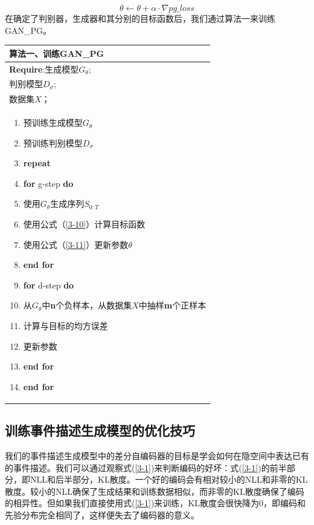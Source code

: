 \begin{equation}\label{3-11}
    \theta \leftarrow \theta + \alpha \cdot \nabla pg\_loss
\end{equation}
在确定了判别器，生成器和其分别的目标函数后，我们通过算法一来训练GAN\_PG。
\begin{table}[htb]
    
    \centering
        \begin{tabular*}{\linewidth}{p{\linewidth}}
\toprule
            算法一、训练GAN\_PG \\
\midrule
\textbf{Require}:生成模型$G_\theta$;\\
判别模型$D_\sigma$;\\
数据集$X$；\\ 
\begin{minipage}[t]{\linewidth}
\begin{enumerate}[itemsep=-3pt]
    \item 预训练生成模型$G_\theta$
    \item 预训练判别模型$D_\sigma$
    \item \textbf{repeat}
    \item \quad \textbf{for} g-step \textbf{do}
    \item \quad \quad 使用$G_\theta$生成序列$S_{0:T}$
    \item \quad \quad 使用公式（\ref{3-10}）计算目标函数
    \item \quad \quad 使用公式（\ref{3-11}）更新参数$\theta$
    \item \quad \textbf{end for}
    \item \quad \textbf{for} d-step \textbf{do}
    \item \quad \quad 从$G_\theta$中\textbf{n}个负样本，从数据集$X$中抽样\textbf{m}个正样本
    \item \quad \quad 计算与目标的均方误差
    \item \quad \quad 更新参数
    \item \quad \textbf{end for}  
    \item \textbf{end for}
\end{enumerate}
\end{minipage}\\
\bottomrule
        \end{tabular*}
    \label{s3-1}
\end{table}

\subsection{训练事件描述生成模型的优化技巧}\label{train_generator}
我们的事件描述生成模型中的差分自编码器的目标是学会如何在隐空间中表达已有的事件描述。我们可以通过观察式(\ref{3-1})来判断编码的好坏：式(\ref{3-1})的前半部分，即NLL和后半部分，KL散度。一个好的编码会有相对较小的NLL和非零的KL散度。较小的NLL确保了生成结果和训练数据相似，而非零的KL散度确保了编码的相异性。但如果我们直接使用式(\ref{3-1})来训练，KL散度会很快降为0，即编码和先验分布完全相同了，这样便失去了编码器的意义。

